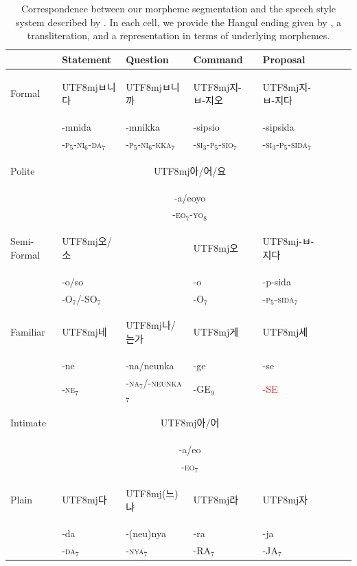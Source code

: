\documentclass[11pt,letterpaper]{article}
\newcommand{\korean}[1]{\begin{CJK}{UTF8}{mj}#1\end{CJK}}
\begin{document}
\begin{table}
\begin{tabular}{l||l|l|l|llll}
            & Statement & Question  & Command    & Proposal    \\ \hline\hline
Formal      &  \korean{ㅂ니다} & \korean{ㅂ니까} & \korean{지-ㅂ-지오} & \korean{지-ㅂ-지다} \\ 
      &  -mnida & -mnikka  & -sipsio & -sipsida  \\ 
      &  -\textsc{p}$_5$-\textsc{ni}$_6$-\textsc{da}$_7$ & -\textsc{p}$_5$-\textsc{ni}$_6$-\textsc{kka}$_7$  & -\textsc{si}$_3$-\textsc{p}$_5$-\textsc{sio}$_7$ & -\textsc{si}$_3$-\textsc{p}$_5$-\textsc{sida}$_7$ \\ \hline
Polite      &  \multicolumn{4}{c}{\korean{아/어/요}}  \\
      &  \multicolumn{4}{c}{-a/eoyo}  \\
            & \multicolumn{4}{c}{-\textsc{eo}$_7$-\textsc{yo}$_8$} \\ \hline
Semi-Formal & \korean{오/소}   &           &   \korean{오}       &  \korean{-ㅂ-지다} \\
&  -o/so   &           & -o        & -p-sida \\
 &  -O$_7$/-SO$_7$   &           & -O$_7$    & -\textsc{p}$_5$-\textsc{sida}$_7$ \\\hline
Familiar    &    \korean{네}    &  \korean{나/는가} &  \korean{게}      &    \korean{세} \\
            & -ne                  & -na/neunka & -ge & -se \\ 
            & -\textsc{ne}$_7$                  & -\textsc{na}$_7$/-\textsc{neunka}$_7$ & -GE$_9$ & \textcolor{red}{-SE} \\ \hline
Intimate      &  \multicolumn{4}{c}{\korean{아/어}}  \\
      &  \multicolumn{4}{c}{-a/eo}  \\
            & \multicolumn{4}{c}{-\textsc{eo}$_7$} \\ \hline
Plain       &   \korean{다}     &  \korean{(느)냐} &  \korean{라}     &  \korean{자}\\
            &  -da    &  -(neu)nya & -ra      & -ja \\
            & -\textsc{da}$_7$    &   -\textsc{nya}$_7$          & -RA$_7$      & -JA$_7$\\
\end{tabular}
\caption{Correspondence between our morpheme segmentation and the speech style system described by \citep[4.3.2]{yeon2010korean}. In each cell, we provide the Hangul ending given by \citep{yeon2010korean}, a transliteration, and a representation in terms of underlying morphemes.}\label{tab:korean-styles}
\end{table}
\end{document}
